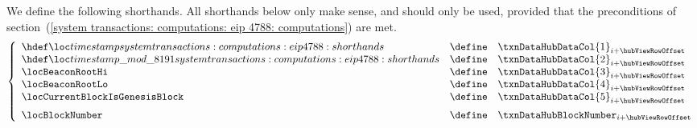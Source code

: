 We define the following shorthands.
All shorthands below only make sense, and should only be used, provided that the preconditions of
section~(\ref{system transactions: computations: eip 4788: computations})
are met.
\[
	\left\{ \begin{array}{lcl}
		\locLineaTimestamp              & \define & \txnDataHubDataCol {1} _{i + \hubViewRowOffset}              \\
		\locLineaTimestampModuloPrime   & \define & \txnDataHubDataCol {2} _{i + \hubViewRowOffset}              \\
		\locBeaconRootHi                & \define & \txnDataHubDataCol {3} _{i + \hubViewRowOffset}              \\
		\locBeaconRootLo                & \define & \txnDataHubDataCol {4} _{i + \hubViewRowOffset}              \\
		\locCurrentBlockIsGenesisBlock  & \define & \txnDataHubDataCol {5} _{i + \hubViewRowOffset} \vspace{2mm} \\
		\locBlockNumber                 & \define & \txnDataHubBlockNumber _{i + \hubViewRowOffset}              \\
	\end{array} \right.
\]
